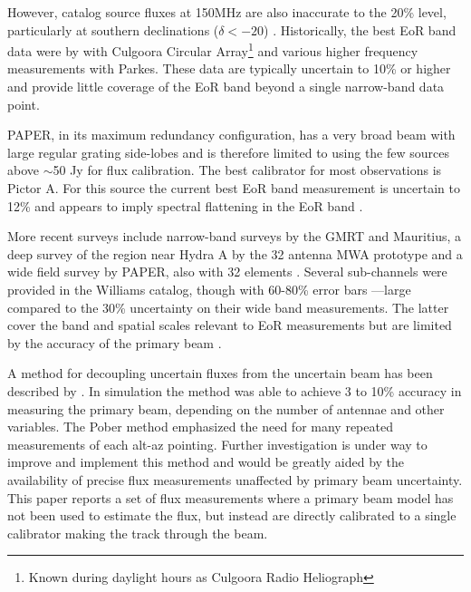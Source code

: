 \documentclass[preprint]{aastex}
\begin{document}
However, catalog source fluxes at 150MHz are also inaccurate to the 20\% level,
particularly at southern declinations ($\delta<-20$\arcdeg) . Historically, the best
EoR band data were by \citet{Slee:1995p7541} with Culgoora Circular
Array\footnote{Known during daylight hours as Culgoora Radio Heliograph} and
various higher frequency measurements with Parkes.  These data are typically
uncertain to 10\% or higher and provide little coverage of the EoR band beyond
a single narrow-band data point. 

PAPER, in its maximum redundancy configuration, has a very broad beam with
large regular grating side-lobes and is therefore limited to using the few
sources above $\sim$50 Jy for flux calibration. The best calibrator for most
observations is Pictor A. For this source the current best EoR band measurement
is uncertain to 12\% and appears to imply spectral flattening in the EoR band
\citep{Perley:1997p9312}.

More recent surveys include narrow-band surveys by the GMRT and Mauritius, a
deep survey of the region near Hydra A by the 32 antenna MWA prototype
\cite{Williams:2012p8768} and a wide field survey by PAPER, also with 32
elements \cite{Jacobs:2011p8438}. Several sub-channels were provided in the
Williams catalog, though with 60-80\% error bars ---large compared to the 30\%
uncertainty on their wide band measurements.  The latter cover the band and
spatial scales relevant to EoR measurements but are limited by the accuracy of
the primary beam \citep{Jacobs:2013p9713}.

A method for decoupling uncertain fluxes from the uncertain beam has been
described by \citet{Pober:2012p8800}. In simulation the method was able to
achieve 3 to 10\% accuracy in measuring the primary beam, depending on the
number of antennae and other variables. The Pober method emphasized the need
for many repeated measurements of each alt-az pointing. Further investigation
is under way to improve and implement this method and would be greatly aided by
the availability of precise flux measurements unaffected by primary beam
uncertainty. This paper reports a set of flux measurements where a primary beam
model has not been used to estimate the flux, but instead are directly
calibrated to a single calibrator making the track through the beam.
\end{document}
